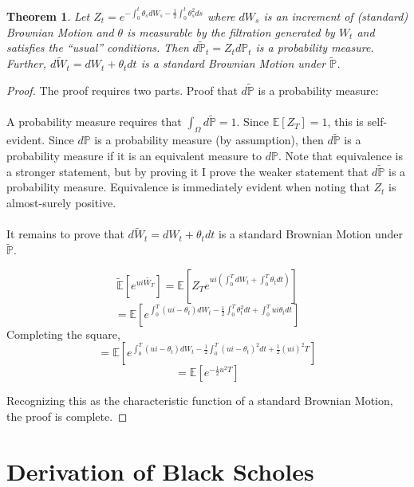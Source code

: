 \documentclass{article}
\newtheorem{theorem}{Theorem}
\begin{document}
\begin{theorem}
	Let \( Z_t=e^{-\int_0 ^t \theta_s dW_s-\frac{1}{2} \int_0 ^ t \theta^2 _s ds} \) where \(dW_s\) is an increment of (standard) Brownian Motion and \(\theta\) is measurable by the filtration generated by \(W_t\) and satisfies the ``usual'' conditions.  Then \(d\mathbb{\tilde{P}}_t=Z_t d\mathbb{P}_t\) is a probability measure. Further, \(d\tilde{W}_t=dW_t+\theta_t dt\) is a standard Brownian Motion under \(\mathbb{\tilde{P}}\).
\end{theorem}
\begin{proof}
The proof requires two parts.  Proof that \( d \mathbb{ \tilde{P} } \) is a probability measure:
\\
\\
A probability measure requires that \( \int_\Omega d \mathbb{ \tilde{P} }=1\).  Since \( \mathbb{E}[Z_T]=1\), this is self-evident.  Since \(d\mathbb{P}\) is a probability measure (by assumption), then \(d\mathbb{\tilde{P}}\) is a probability measure if it is an equivalent measure to \(d\mathbb{P}\).  Note that equivalence is a stronger statement, but by proving it I prove the weaker statement that \(d \mathbb{\tilde{P}}\) is a probability measure.  Equivalence is immediately evident when noting that \(Z_t\) is almost-surely positive.  
\\
\\
It remains to prove that \(d\tilde{W}_t=dW_t+\theta_t dt\) is a standard Brownian Motion under \(\mathbb{\tilde{P}}\).

\[\mathbb{\tilde{E}}\left[e^{ui\tilde{W_T}}\right]=\mathbb{E}\left[Z_Te^{ui \left(\int_0 ^ T dW_t+\int_0^T \theta_t dt\right)}\right]\]
\[=\mathbb{E}\left[e^{\int_0 ^T (ui-\theta_t)dW_t-\frac{1}{2}\int_0^T \theta^2_t dt + \int_0^T ui\theta_t dt}\right]\]
Completing the square, 
\[=\mathbb{E}\left[e^{\int_0 ^T (ui-\theta_t)dW_t-\frac{1}{2}\int_0^T  (ui-\theta_t)^2 dt + \frac{1}{2} (ui)^2 T } \right]\]
\[=\mathbb{E}\left[ e^{ -\frac{1}{2} u^2 T } \right]\]

Recognizing this as the characteristic function of a standard Brownian Motion, the proof is complete.
\end{proof}

\section{Derivation of Black Scholes}
\end{document}
